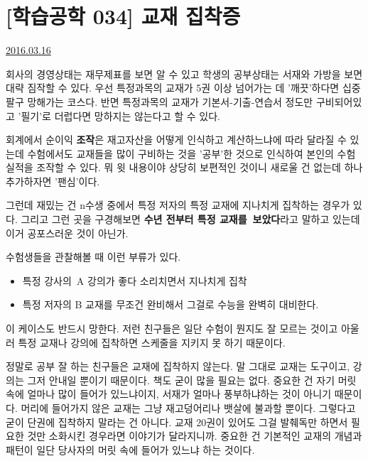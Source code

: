\section{[학습공학 034] 교재 집착증}
\href{https://www.kockoc.com/Apoc/678660}{2016.03.16}

\vspace{5mm}

회사의 경영상태는 재무제표를 보면 알 수 있고
학생의 공부상태는 서재와 가방을 보면 대략 짐작할 수 있다.
우선 특정과목의 교재가 5권 이상 넘어가는 데 '깨끗'하다면 십중팔구 망해가는 코스다.
반면 특정과목의 교재가 기본서-기출-연습서 정도만 구비되어있고 '필기'로 더럽다면 망하지는 않는다고 할 수 있다.
\vspace{5mm}

회계에서 순이익 \textbf{조작}은 재고자산을 어떻게 인식하고 계산하느냐에 따라 달라질 수 있는데
수험에서도 교재들을 많이 구비하는 것을 '공부'한 것으로 인식하여 본인의 수험 실적을 조작할 수 있다.
뭐 윗 내용이야 상당히 보편적인 것이니 새로울 건 없는데 하나 추가하자면 '팬심'이다.
\vspace{5mm}

그런데 재밌는 건 n수생 중에서 특정 저자의 특정 교재에 지나치게 집착하는 경우가 있다.
그리고 그런 곳을 구경해보면 \textbf{수년 전부터 특정 교재를 보았다}라고 말하고 있는데 이거 공포스러운 것이 아닌가.
\vspace{5mm}

수험생들을 관찰해볼 때 이런 부류가 있다.
\vspace{5mm}
\begin{itemize}
    \item 특정 강사의 A 강의가 좋다 소리치면서 지나치게 집착
    \item 특정 저자의 B 교재를 무조건 완비해서 그걸로 수능을 완벽히 대비한다.
\end{itemize}

\vspace{5mm}

이 케이스도 반드시 망한다.
저런 친구들은 일단 수험이 뭔지도 잘 모르는 것이고
아울러 특정 교재나 강의에 집착하면 스케줄을 지키지 못 하기 때문이다.
\vspace{5mm}

정말로 공부 잘 하는 친구들은 교재에 집착하지 않는다. 말 그대로 교재는 도구이고, 강의는 그저 안내일 뿐이기 때문이다.
책도 굳이 많을 필요는 없다. 중요한 건 자기 머릿 속에 얼마나 많이 들어가 있느냐이지, 서재가 얼마나 풍부하냐하는 것이 아니기 때문이다.
머리에 들어가지 않은 교재는 그냥 재고덩어리나 뱃살에 불과할 뿐이다.
그렇다고 굳이 단권에 집착하지 말라는 건 아니다.
교재 20권이 있어도 그걸 발췌독만 하면서 필요한 것만 소화시킨 경우라면 이야기가 달라지니까.
중요한 건 기본적인 교재의 개념과 패턴이 일단 당사자의 머릿 속에 들어가 있느냐 하는 것이다.
\vspace{5mm}

